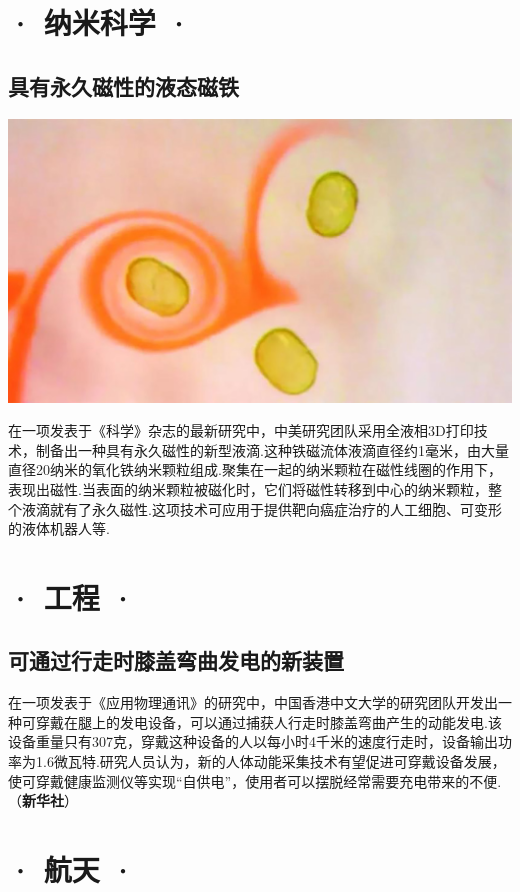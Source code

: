 \begin{multicols}{2}
\section*{· 纳米科学 ·}

\subsection*{具有永久磁性的液态磁铁}

{\centering\includegraphics[width=0.8\linewidth]{Interstellar/IMG/201907/10.jpg}\vskip0cm}

在一项发表于《科学》杂志的最新研究中，中美研究团队采用全液相3D打印技术，制备出一种具有永久磁性的新型液滴.这种铁磁流体液滴直径约1毫米，由大量直径20纳米的氧化铁纳米颗粒组成.聚集在一起的纳米颗粒在磁性线圈的作用下，表现出磁性.当表面的纳米颗粒被磁化时，它们将磁性转移到中心的纳米颗粒，整个液滴就有了永久磁性.这项技术可应用于提供靶向癌症治疗的人工细胞、可变形的液体机器人等.

\section*{· 工程 ·}

\subsection*{可通过行走时膝盖弯曲发电的新装置}

在一项发表于《应用物理通讯》的研究中，中国香港中文大学的研究团队开发出一种可穿戴在腿上的发电设备，可以通过捕获人行走时膝盖弯曲产生的动能发电.该设备重量只有307克，穿戴这种设备的人以每小时4千米的速度行走时，设备输出功率为1.6微瓦特.研究人员认为，新的人体动能采集技术有望促进可穿戴设备发展，使可穿戴健康监测仪等实现“自供电”，使用者可以摆脱经常需要充电带来的不便.（\textbf{新华社}）

\section*{· 航天 ·}


\end{multicols}
